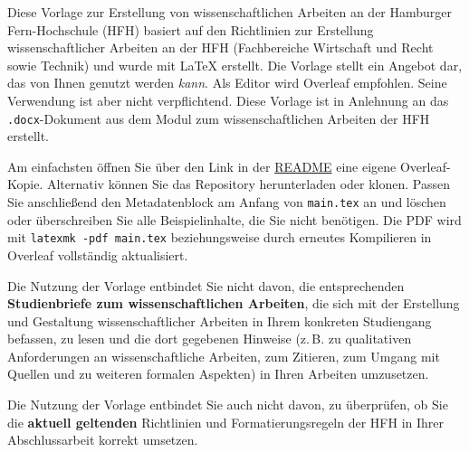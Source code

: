 
Diese Vorlage zur Erstellung von wissenschaftlichen Arbeiten an der
Hamburger Fern-Hochschule (HFH) basiert auf den Richtlinien zur Erstellung
wissenschaftlicher Arbeiten an der HFH (Fachbereiche Wirtschaft und Recht
sowie Technik) und wurde mit \LaTeX{} erstellt. Die Vorlage stellt ein Angebot
dar, das von Ihnen genutzt werden \textit{kann}. Als Editor wird Overleaf
empfohlen. Seine Verwendung ist aber nicht verpflichtend. Diese Vorlage
ist in Anlehnung an das \texttt{.docx}-Dokument aus dem Modul zum
wissenschaftlichen Arbeiten der HFH erstellt.

Am einfachsten öffnen Sie über den Link in der
\href{https://github.com/ilyaZar/hfh-latex-template}{README} eine eigene
Overleaf-Kopie. Alternativ können Sie das Repository herunterladen oder
klonen. Passen Sie anschließend den Metadatenblock am Anfang von
\texttt{main.tex} an und löschen oder überschreiben Sie alle Beispielinhalte,
die Sie nicht benötigen. Die PDF wird mit
\texttt{latexmk -pdf main.tex} beziehungsweise durch erneutes Kompilieren in
Overleaf vollständig aktualisiert.

Die Nutzung der Vorlage entbindet Sie nicht davon, die entsprechenden
\textbf{Studienbriefe zum wissenschaftlichen Arbeiten}, die sich mit der
Erstellung und Gestaltung wissenschaftlicher Arbeiten in Ihrem konkreten
Studiengang befassen, zu lesen und die dort gegebenen Hinweise (z.\,B. zu
qualitativen Anforderungen an wissenschaftliche Arbeiten, zum Zitieren, zum
Umgang mit Quellen und zu weiteren formalen Aspekten) in Ihren Arbeiten
umzusetzen.

Die Nutzung der Vorlage entbindet Sie auch nicht davon, zu überprüfen, ob
Sie die \textbf{aktuell geltenden} Richtlinien und Formatierungsregeln
der HFH in Ihrer Abschlussarbeit korrekt umsetzen.
